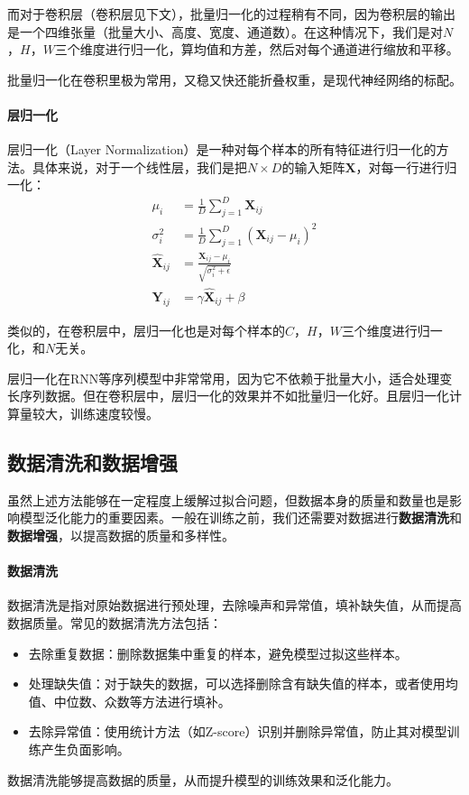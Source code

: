 而对于卷积层（卷积层见下文），批量归一化的过程稍有不同，因为卷积层的输出是一个四维张量（批量大小、高度、宽度、通道数）。在这种情况下，我们是对$N$，$H$，$W$三个维度进行归一化，算均值和方差，然后对每个通道进行缩放和平移。

批量归一化在卷积里极为常用，又稳又快还能折叠权重，是现代神经网络的标配。

\paragraph{层归一化}
层归一化（Layer Normalization）是一种对每个样本的所有特征进行归一化的方法。具体来说，对于一个线性层，我们是把$N\times D$的输入矩阵$\mathbf{X}$，对每一行进行归一化：
\begin{align*}
\mu_i &= \frac{1}{D} \sum_{j=1}^{D} \mathbf{X}_{ij} \\
\sigma_i^2 &= \frac{1}{D} \sum_{j=1}^{D} (\mathbf{X}_{ij} - \mu_i)^2 \\
\hat{\mathbf{X}}_{ij} &= \frac{\mathbf{X}_{ij} - \mu_i}{\sqrt{\sigma_i^2 + \epsilon}} \\
\mathbf{Y}_{ij} &= \gamma \hat{\mathbf{X}}_{ij} + \beta
\end{align*}

类似的，在卷积层中，层归一化也是对每个样本的$C$，$H$，$W$三个维度进行归一化，和$N$无关。

层归一化在RNN等序列模型中非常常用，因为它不依赖于批量大小，适合处理变长序列数据。但在卷积层中，层归一化的效果并不如批量归一化好。且层归一化计算量较大，训练速度较慢。

\subsection{数据清洗和数据增强}

虽然上述方法能够在一定程度上缓解过拟合问题，但数据本身的质量和数量也是影响模型泛化能力的重要因素。一般在训练之前，我们还需要对数据进行\textbf{数据清洗}和\textbf{数据增强}，以提高数据的质量和多样性。

\paragraph{数据清洗}
数据清洗是指对原始数据进行预处理，去除噪声和异常值，填补缺失值，从而提高数据质量。常见的数据清洗方法包括：
\begin{itemize}
    \item 去除重复数据：删除数据集中重复的样本，避免模型过拟这些样本。
    \item 处理缺失值：对于缺失的数据，可以选择删除含有缺失值的样本，或者使用均值、中位数、众数等方法进行填补。
    \item 去除异常值：使用统计方法（如Z-score）识别并删除异常值，防止其对模型训练产生负面影响。
\end{itemize}
数据清洗能够提高数据的质量，从而提升模型的训练效果和泛化能力。

